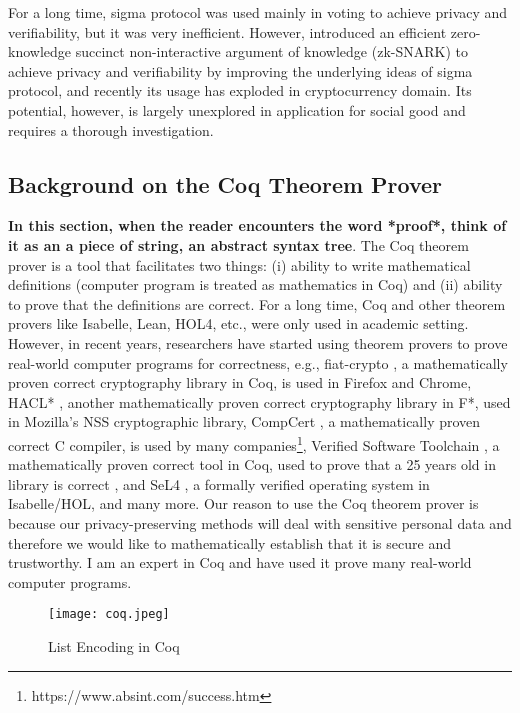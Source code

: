 \documentclass[12pt,a4paper]{article}
\begin{document}
For a long time, sigma protocol was used mainly in voting to achieve privacy and 
verifiability, but it was very inefficient.  However, \cite{groth2010short, 10.1007/978-3-642-38348-9_37} 
introduced an efficient zero-knowledge succinct non-interactive argument of knowledge (zk-SNARK) 
to achieve privacy and verifiability by 
improving the underlying ideas of sigma protocol, and recently its usage has exploded 
in cryptocurrency domain. Its potential, however, is largely unexplored in application 
for social good and requires a thorough investigation. 


\subsection*{Background on the Coq Theorem Prover}
\textbf{In this section, when the reader encounters the word *proof*, think of it as an a piece of string, an abstract syntax tree}. 
The Coq theorem prover \cite{the_coq_development_team_2019_3476303} is a tool that facilitates two things: (i) ability to write 
mathematical definitions (computer program is treated 
as mathematics in Coq) and (ii) ability to prove that the definitions are correct. For a long time,
Coq and other theorem provers like Isabelle, Lean, HOL4, etc., were only used in academic setting. 
However, in recent years, researchers have started using theorem provers to 
prove real-world computer programs for correctness, e.g., fiat-crypto \cite{8835346}, 
a mathematically proven correct cryptography library in Coq, is 
used in Firefox and Chrome, HACL* \cite{10.1145/3133956.3134043}, another 
mathematically proven correct cryptography library in F*, used in  Mozilla's NSS cryptographic library, 
CompCert \cite{Blazy-Leroy-05}, a mathematically proven correct C compiler, is used by many 
companies\footnote{https://www.absint.com/success.htm}, 
Verified Software Toolchain \cite{10.1007/978-3-540-74591-4_3}, a mathematically proven correct tool in Coq, 
used to prove that a 25 years old 
in library is correct \cite{10.1007/978-3-031-13188-2_14}, and SeL4 \cite{10.1145/1743546.1743574}, a formally 
verified operating system in Isabelle/HOL, and many more. 
Our reason to use the Coq theorem prover is because our privacy-preserving 
methods will deal with sensitive personal data and therefore we would 
like to mathematically establish that it is secure and trustworthy. 
I am an expert in Coq and have used it prove many real-world computer programs. 


\begin{wrapfigure}{r}{0.30\textwidth} %
  \centering
\texttt{[image: coq.jpeg]}
\caption{List Encoding in Coq}
\label{fig:coq}
\end{wrapfigure}
\end{document}
